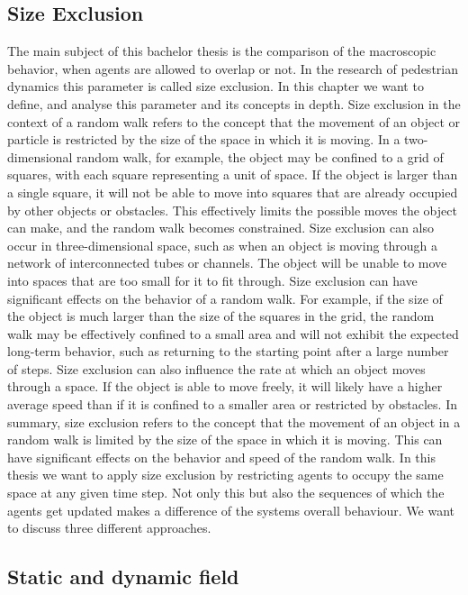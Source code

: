\subsection{Size Exclusion}
The main subject of this bachelor thesis is the comparison of the macroscopic behavior, when agents are allowed to overlap or not.
In the research of pedestrian dynamics this parameter is called size exclusion. In this chapter we want to define, and analyse this parameter and its concepts in depth. 
Size exclusion in the context of a random walk refers to the concept that the movement of an object or particle is restricted by the size of the space in which it is moving.
In a two-dimensional random walk, for example, the object may be confined to a grid of squares, with each square representing a unit of space. If the object is larger than a single square, it will not be able to move into squares that are already occupied by other objects or obstacles. This effectively limits the possible moves the object can make, and the random walk becomes constrained.
Size exclusion can also occur in three-dimensional space, such as when an object is moving through a network of interconnected tubes or channels. The object will be unable to move into spaces that are too small for it to fit through.
Size exclusion can have significant effects on the behavior of a random walk. For example, if the size of the object is much larger than the size of the squares in the grid, the random walk may be effectively confined to a small area and will not exhibit the expected long-term behavior, such as returning to the starting point after a large number of steps.
Size exclusion can also influence the rate at which an object moves through a space. If the object is able to move freely, it will likely have a higher average speed than if it is confined to a smaller area or restricted by obstacles.
In summary, size exclusion refers to the concept that the movement of an object in a random walk is limited by the size of the space in which it is moving. This can have significant effects on the behavior and speed of the random walk.
In this thesis we want to apply size exclusion by restricting agents to occupy the same space at any given time step.
Not only this but also the sequences of which the agents get updated makes a difference of the systems overall behaviour.
We want to discuss three different approaches.

\subsection{Static and dynamic field}


